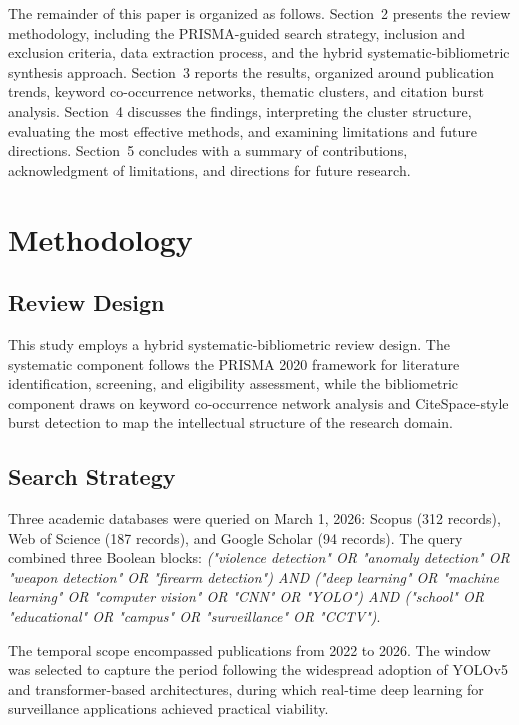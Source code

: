 \documentclass[conference]{IEEEtran}
\begin{document}
The remainder of this paper is organized as follows. Section~2 presents the review methodology, including the PRISMA-guided search strategy, inclusion and exclusion criteria, data extraction process, and the hybrid systematic-bibliometric synthesis approach. Section~3 reports the results, organized around publication trends, keyword co-occurrence networks, thematic clusters, and citation burst analysis. Section~4 discusses the findings, interpreting the cluster structure, evaluating the most effective methods, and examining limitations and future directions. Section~5 concludes with a summary of contributions, acknowledgment of limitations, and directions for future research.

\section{Methodology}

\subsection{Review Design}

This study employs a hybrid systematic-bibliometric review design. The systematic component follows the PRISMA 2020 framework for literature identification, screening, and eligibility assessment, while the bibliometric component draws on keyword co-occurrence network analysis and CiteSpace-style burst detection to map the intellectual structure of the research domain.

\subsection{Search Strategy}

Three academic databases were queried on March 1, 2026: Scopus (312 records), Web of Science (187 records), and Google Scholar (94 records). The query combined three Boolean blocks: \textit{("violence detection" OR "anomaly detection" OR "weapon detection" OR "firearm detection") AND ("deep learning" OR "machine learning" OR "computer vision" OR "CNN" OR "YOLO") AND ("school" OR "educational" OR "campus" OR "surveillance" OR "CCTV")}.

The temporal scope encompassed publications from 2022 to 2026. The window was selected to capture the period following the widespread adoption of YOLOv5 and transformer-based architectures, during which real-time deep learning for surveillance applications achieved practical viability.
\end{document}
